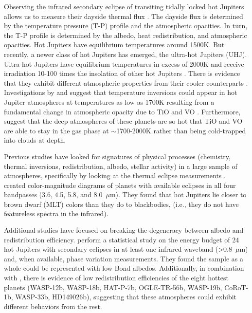 Observing the infrared secondary eclipse of transiting tidally locked hot Jupiters allows us to measure their  dayside thermal flux \citep[e.g.,][]{Charbonneau2005, Deming2005a, Cowan2011a, Cowan2011b,Triaud2014c, Schwartz2015, Schwartz2017, Zhang2018c,Garhart2020}. The dayside flux is determined by the temperature pressure (T-P) profile and the atmospheric opacities. In turn, the T-P profile is determined by the albedo, heat redistribution, and  atmospheric opacities.
Hot Jupiters have equilibrium temperatures around 1500K. But recently, a newer class of hot Jupiters has emerged, the ultra-hot Jupiters (UHJ). Ultra-hot Jupiters have equilibrium temperatures in excess of 2000K and receive irradiation 10-100 times the insolation of other hot Jupiters \citep[e.g., Figure 9.][]{Parmentier2018b}. There is evidence that they exhibit different atmospheric properties from their cooler counterparts \citep[e.g.,][]{Bell2017, Arcangeli2018, Mansfield2018b, Parmentier2018b, Kreidberg2018b}. Investigations by \citet{Hubeny2003, Fortney2006b} and \citet{Fortney2008} suggest that temperature inversions could appear in hot Jupiter atmospheres at temperatures as low as 1700K resulting from a fundamental change in atmospheric opacity due to TiO and VO \citep{Gandhi2019}. Furthermore, \citet{Thorngren2019} suggest that the deep atmospheres of these planets are so hot that TiO and VO are able to stay in the gas phase at $\sim$1700-2000K rather than being cold-trapped into clouds at depth.


Previous studies have looked for signatures of physical processes (chemistry, thermal inversions, redistribution, albedo, stellar activity) in a large sample of atmospheres, specifically by looking at the thermal eclipse measurements \citep{Knutson2010, Cowan2011b, Triaud2014c, Schwartz2015, Schwartz2017, Zhang2018a, Garhart2020, Keating2019, Melville2020}. \citet{Triaud2014c} created color-magnitude diagrams of planets with available \spitzerIRAC eclipses in all four bandpasses (3.6, 4.5, 5.8, and 8.0~$\mu$m). They found that hot Jupiters lie closer to brown dwarf (MLT) colors than they do to blackbodies, (i.e., they do not have featureless spectra in the infrared).


Additional studies have focused on breaking the degeneracy between albedo and redistribution efficiency. \citet{Cowan2011b} perform a statistical study on the energy budget of 24 hot Jupiters with secondary eclipses in at least one infrared waveband (>0.8~$\mu$m) and, when available, phase variation measurements. They found the sample as a whole could be represented with low Bond albedos. Additionally, in combination with \citet{Zhang2018a}, there is evidence of low redistribution efficiencies of the eight hottest planets (WASP-12b, WASP-18b, HAT-P-7b, OGLE-TR-56b, WASP-19b, CoRoT-1b, WASP-33b, HD149026b), suggesting that these atmospheres could exhibit different behaviors from the rest.

